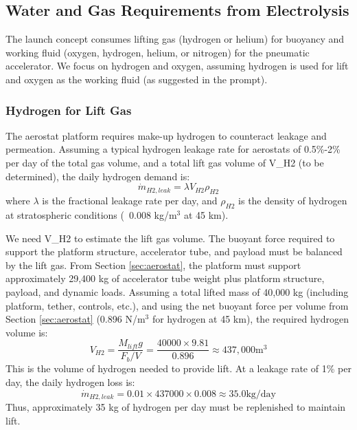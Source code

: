 \subsection{Water and Gas Requirements from Electrolysis}
The launch concept consumes lifting gas (hydrogen or helium) for buoyancy and working fluid (oxygen, hydrogen, helium, or nitrogen) for the pneumatic accelerator. We focus on hydrogen and oxygen, assuming hydrogen is used for lift and oxygen as the working fluid (as suggested in the prompt).

\subsubsection{Hydrogen for Lift Gas}
The aerostat platform requires make-up hydrogen to counteract leakage and permeation. Assuming a typical hydrogen leakage rate for aerostats of 0.5\%-2\% per day of the total gas volume, and a total lift gas volume of V\_{H2} (to be determined), the daily hydrogen demand is:
\begin{equation}
\dot{m}_{H2,leak} = \lambda V_{H2} \rho_{H2}
\end{equation}
where \(\lambda\) is the fractional leakage rate per day, and \(\rho_{H2}\) is the density of hydrogen at stratospheric conditions (~0.008 kg/m$^3$ at 45 km).

We need V\_{H2} to estimate the lift gas volume. The buoyant force required to support the platform structure, accelerator tube, and payload must be balanced by the lift gas. From Section \ref{sec:aerostat}, the platform must support approximately 29,400 kg of accelerator tube weight plus platform structure, payload, and dynamic loads. Assuming a total lifted mass of 40,000 kg (including platform, tether, controls, etc.), and using the net buoyant force per volume from Section \ref{sec:aerostat} (0.896 N/m$^3$ for hydrogen at 45 km), the required hydrogen volume is:
\begin{equation}
V_{H2} = \frac{M_{lift} g}{F_b/V} = \frac{40000 \times 9.81}{0.896} \approx 437,000  \text{m}^3
\end{equation}
This is the volume of hydrogen needed to provide lift. At a leakage rate of 1\% per day, the daily hydrogen loss is:
\begin{equation}
\dot{m}_{H2,leak} = 0.01 \times 437000 \times 0.008 \approx 35.0  \text{kg/day}
\end{equation}
Thus, approximately 35 kg of hydrogen per day must be replenished to maintain lift.

